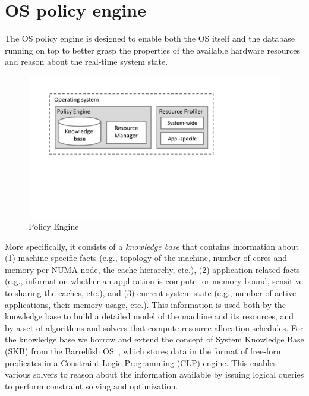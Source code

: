 \documentclass[11pt]{article}
\begin{document}
% 

\section{OS policy engine}
\label{sec:policy}

The OS policy engine is designed to enable both the OS itself and the database running on top
to better grasp the properties of the available hardware resources and reason about the 
real-time system state. 

\begin{figure}
  \centering
  \includegraphics[scale=0.6, trim=2cm 8cm 8cm 2cm, clip=true]
    {figs/intro_policyengine}
  \caption{Policy Engine}
  \label{fig:policy_engine}
\end{figure}

More specifically, it consists of a \textit{knowledge base} that contains
information about (1) machine specific facts (e.g., topology of the machine, number of cores and
memory per NUMA node, the cache hierarchy, etc.), (2) application-related facts
(e.g., information whether an application is compute- or memory-bound, sensitive to sharing 
the caches, etc.), and (3) current system-state (e.g., number of active applications, 
their memory usage, etc.). This information is used both by the knowledge base to build
a detailed model of the machine and its resources, and by a set of algorithms and solvers
that compute resource allocation schedules. 
For the knowledge base we borrow and extend the concept of System Knowledge Base (SKB) 
from the Barrelfish OS~\cite{Schuepbach12, barrelfish}, which stores data in the format of
free-form predicates in a Constraint Logic Programming (CLP) engine. This enables various 
solvers to reason about the information available by issuing logical queries to perform 
constraint solving and optimization.
\end{document}

